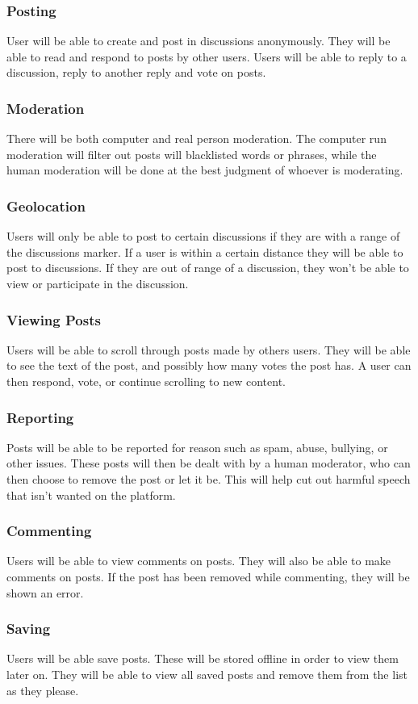 \documentclass[12pt]{article}
\begin{document}
\subsubsection{Posting}
User will be able to create and post in discussions anonymously.  They will be able to read and respond to posts by other users.  Users will be able to reply to a discussion, reply to another reply and vote on posts.
\subsubsection{Moderation}
There will be both computer and real person moderation.  The computer run moderation will filter out posts will blacklisted words or phrases, while the human moderation will be done at the best judgment of whoever is moderating.
\subsubsection{Geolocation}
Users will only be able to post to certain discussions if they are with a range of the discussions marker.  If a user is within a certain distance they will be able to post to discussions.  If they are out of range of a discussion, they won’t be able to view or participate in the discussion.
\subsubsection{Viewing Posts}
Users will be able to scroll through posts made by others users.  They will be able to see the text of the post, and possibly how many votes the post has.  A user can then respond, vote, or continue scrolling to new content.
\subsubsection{Reporting}
Posts will be able to be reported for reason such as spam, abuse, bullying, or other issues.  These posts will then be dealt with by a human moderator, who can then choose to remove the post or let it be.  This will help cut out harmful speech that isn’t wanted on the platform.
\subsubsection{Commenting}
Users will be able to view  comments on posts. They will also be able to make comments on posts. If the post has been removed while commenting, they will be shown an error.
\subsubsection{Saving}
Users will be able save posts. These will be stored offline in order to view them later on. They will be able to view all saved posts and remove them from the list as they please.
\end{document}
